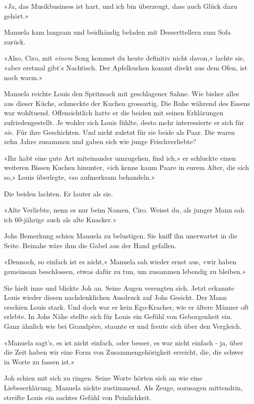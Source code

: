 «Ja, das Musikbusiness ist hart, und ich bin überzeugt, dass auch Glück
dazu gehört.»

Manuela kam langsam und beidhändig beladen mit Desserttellern zum Sofa
zurück.

«Also, Ciro, mit \emph{einem} Song kommst du heute definitiv nicht
davon,» lachte sie, «aber erstmal gibt’s Nachtisch. Der Apfelkuchen
kommt direkt aus dem Ofen, ist noch warm.»

Manuela reichte Louis den Spritzsack mit geschlagener Sahne. Wie bisher alles aus dieser Küche, schmeckte
der Kuchen grossartig. Die Ruhe während des Essens war wohltuend.
Offensichtlich hatte er die beiden mit seinen Erklärungen 
zufriedengestellt.
Je wohler sich Louis fühlte, desto mehr interessierte er sich für
\emph{sie.} Für ihre Geschichten. Und nicht zuletzt für sie beide als
Paar. Die waren zehn Jahre zusammen und gaben sich wie junge
Frischverliebte? 

«Ihr habt eine gute Art miteinander umzugehen, find ich,» er schluckte 
einen weiteren Bissen Kuchen hinunter, «ich kenne kaum Paare in eurem
Alter, die sich so,» Louis überlegte, «so
aufmerksam behandeln.»

Die beiden lachten. Er lauter als sie.

«Alte Verliebte, nenn es nur beim Namen, Ciro. Weisst du, als junger Mann
sah ich 60-jährige auch als alte Knacker.»

Johs Bemerkung schien Manuela zu belustigen. Sie kniff ihn unerwartet in
die Seite. Beinahe wäre ihm die Gabel aus der Hand gefallen. 

«Dennoch, so einfach ist es nicht,» Manuela sah wieder ernst aus, «wir
haben gemeinsam beschlossen, etwas dafür zu tun, um zusammen lebendig zu
bleiben.»

Sie hielt inne und blickte Joh an. Seine Augen verengten sich. Jetzt 
erkannte Louis wieder diesen nachdenklichen Ausdruck auf Johs
Gesicht. Der Mann erschien Louis stark. Und doch war er kein Ego-Kracher, wie er ältere
Männer oft erlebte. In Johs Nähe stellte sich für Louis ein Gefühl von
Geborgenheit ein. Ganz ähnlich wie bei Grandpère, staunte er und freute
sich über den Vergleich.

«Manuela sagt’s, es ist nicht einfach, oder besser, es war nicht
einfach - ja, über die Zeit haben wir eine Form  
von Zusammengehörigkeit erreicht, die, die schwer in
Worte zu fassen ist.»

Joh schien mit sich zu ringen. Seine Worte hörten sich an wie eine
Liebeserklärung. Manuela nickte zustimmend. Als Zeuge, sozusagen mittendrin, streifte Louis 
ein sachtes Gefühl von Peinlichkeit. 

